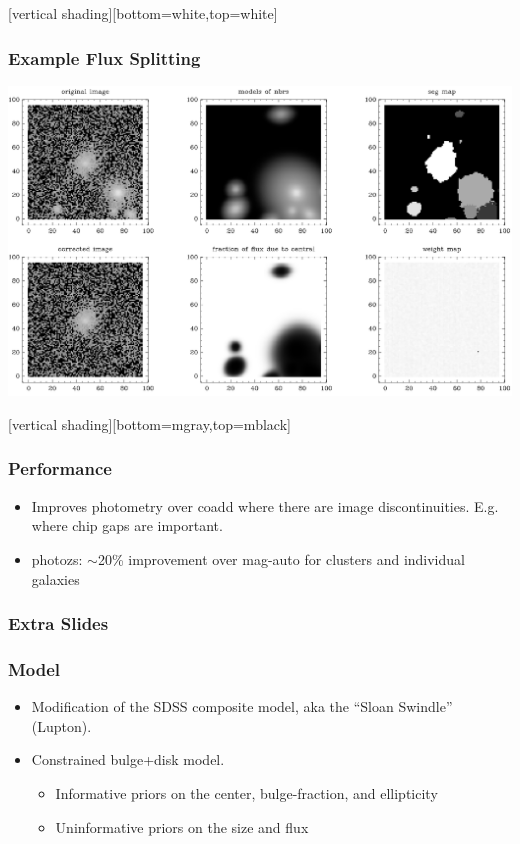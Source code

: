 \documentclass{beamer}
\begin{document}
{
    [vertical shading][bottom=white,top=white]
    \frame
    {
        \frametitle{Example Flux Splitting}

     
        \begin{center}
            \includegraphics[width=\textwidth]{314469384-mb-cm-max-nbrs-band1-icut1-crop.png}
            \newline
        \end{center}


    }
    [vertical shading][bottom=mgray,top=mblack]
}



\frame
{
    \frametitle{Performance}

    \begin{itemize}

        \item Improves photometry over coadd where there are image
            discontinuities.  E.g. where chip gaps are important.

        \item photozs:  $\sim$20\% improvement over mag-auto for clusters and individual
            galaxies

    \end{itemize}

}

\frame
{
    \frametitle{Extra Slides}


}




\frame
{
    \frametitle{Model}


    \begin{itemize}

        \item Modification of the SDSS composite model, aka the ``Sloan
            Swindle'' (Lupton).

        \item Constrained bulge+disk model.

            \begin{itemize}
                \item Informative priors on the center, bulge-fraction, and ellipticity
                \item Uninformative priors on the size and flux
            \end{itemize}


    \end{itemize}

}
\end{document}
